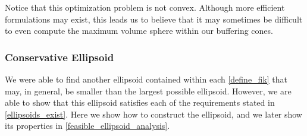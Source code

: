 \documentclass{article}
\newenvironment{comment}
  {\par\medskip
   \color{red}%
   \begin{framed}
   \textbf{Comment: }\ignorespaces}
 {\end{framed}
  \medskip}
\theoremstyle{case}
\begin{document}
% 
% 
% 
% 
% 
% 
% 

Notice that this optimization problem is not convex.
Although more efficient formulations may exist, this leads us to believe that it may sometimes be difficult to even compute the maximum volume sphere within our buffering cones.



\subsubsection{Conservative Ellipsoid}

We were able to find another ellipsoid contained within each \cref{define_fik} that may, in general, be smaller than the largest possible ellipsoid.
However, we are able to show that this ellipsoid satisfies each of the requirements stated in \cref{ellipsoids_exist}.
Here we show how to construct the ellipsoid, and we later show its properties in \cref{feasible_ellipsoid_analysis}.
\end{document}
